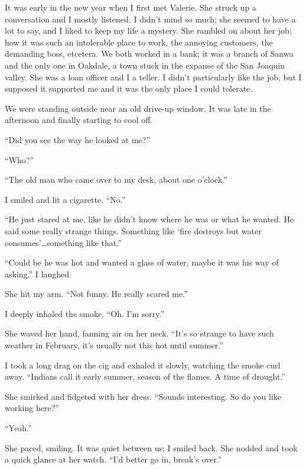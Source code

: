 It was early in the new year when I first met Valerie. She struck up a
conversation and I mostly listened. I didn't mind so much; she seemed to
have a lot to say, and I liked to keep my life a mystery. She rambled on
about her job: how it was such an intolerable place to work, the
annoying customers, the demanding boss, etcetera. We both worked in a
bank; it was a branch of Sanwa and the only one in Oakdale, a town stuck
in the expanse of the San Joaquin valley. She was a loan officer and I a
teller. I didn't particularly like the job, but I supposed it supported
me and it was the only place I could tolerate.

We were standing outside near an old drive-up window. It was late in the
afternoon and finally starting to cool off.

``Did you see the way he looked at me?''

``Who?''

``The old man who came over to my desk, about one o'clock.''

I smiled and lit a cigarette. ``No.''

``He just stared at me, like he didn't know where he was or what he
wanted. He said some really strange things. Something like `fire
destroys but water consumes'\ldots something like that.''

``Could be he was hot and wanted a glass of water, maybe it was his way
of asking.'' I laughed.

She hit my arm. ``Not funny. He really scared me.''

I deeply inhaled the smoke. ``Oh. I'm sorry.''

She waved her hand, fanning air on her neck. ``It's so strange to have
such weather in February, it's usually not this hot until summer.''

I took a long drag on the cig and exhaled it slowly, watching the smoke
curl away. ``Indians call it early summer, season of the flames. A time
of drought.''

She smirked and fidgeted with her dress. ``Sounds interesting. So do you
like working here?''

``Yeah.''

She paced, smiling. It was quiet between us; I smiled back. She nodded
and took a quick glance at her watch. ``I'd better go in, break's
over.''

